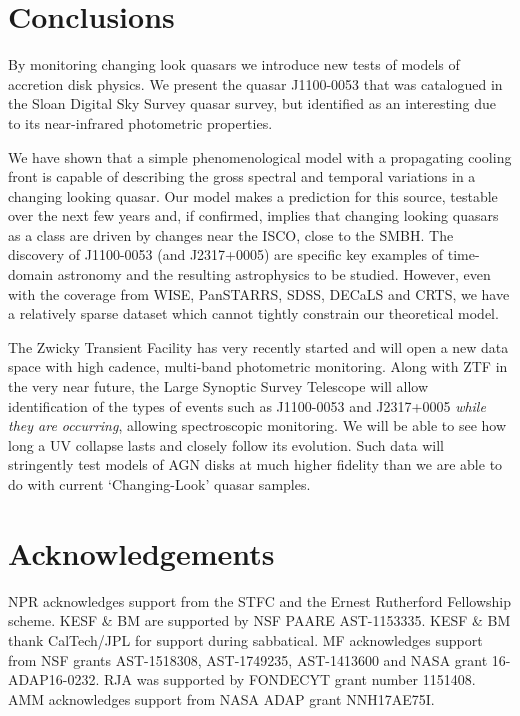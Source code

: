 \documentclass[a4paper,fleqn,usenatbib]{mnras}
\begin{document}
\section{Conclusions} 
By monitoring changing look quasars we introduce new
tests of models of accretion disk physics. We present the 
quasar J1100-0053 that was catalogued in the Sloan Digital 
Sky Survey quasar survey, but identified as an interesting due 
to its near-infrared photometric properties. 

We have shown that a simple
phenomenological model with a propagating cooling front is capable of
describing the gross spectral and temporal variations in a changing
looking quasar. Our model makes a prediction for this source, testable
over the next few years and, if confirmed, implies that changing
looking quasars as a class are driven by changes near the ISCO, close
to the SMBH. The discovery of J1100-0053 (and J2317+0005) are specific
key examples of time-domain astronomy and the resulting astrophysics
to be studied. However, even with the coverage from WISE, PanSTARRS,
SDSS, DECaLS and CRTS, we have a relatively sparse dataset which
cannot tightly constrain our theoretical model. 

The Zwicky Transient
Facility \citep[ZTF; ][]{Bellm2014} has very recently started and will
open a new data space with high cadence, multi-band photometric
monitoring. Along with ZTF in the very near future, the Large Synoptic
Survey Telescope \citep{Ivezic2008, LSST_ScienceBookV2} will allow
identification of the types of events such as J1100-0053 and
J2317+0005 \emph{while they are occurring}, allowing spectroscopic
monitoring. We will be able to see how long a UV collapse lasts and
closely follow its evolution.  Such data will stringently test models
of AGN disks at much higher fidelity than we are able to do with
current `Changing-Look' quasar samples.

\smallskip
\smallskip


\smallskip
\smallskip


\section*{Acknowledgements}
NPR acknowledges support from the STFC and the Ernest Rutherford
Fellowship scheme.  KESF \& BM are supported by NSF PAARE
AST-1153335. KESF \& BM thank CalTech/JPL for support during
sabbatical.  MF acknowledges support from NSF grants AST-1518308,
AST-1749235, AST-1413600 and NASA grant 16-ADAP16-0232.  RJA was
supported by FONDECYT grant number 1151408. AMM acknowledges
support from NASA ADAP grant NNH17AE75I.
\end{document}
